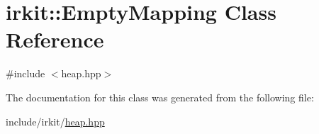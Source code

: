 \hypertarget{classirkit_1_1EmptyMapping}{}\section{irkit\+:\+:Empty\+Mapping Class Reference}
\label{classirkit_1_1EmptyMapping}


{\ttfamily \#include $<$heap.\+hpp$>$}



The documentation for this class was generated from the following file\+:\begin{DoxyCompactItemize}
\item 
include/irkit/\mbox{\hyperlink{heap_8hpp}{heap.\+hpp}}\end{DoxyCompactItemize}
